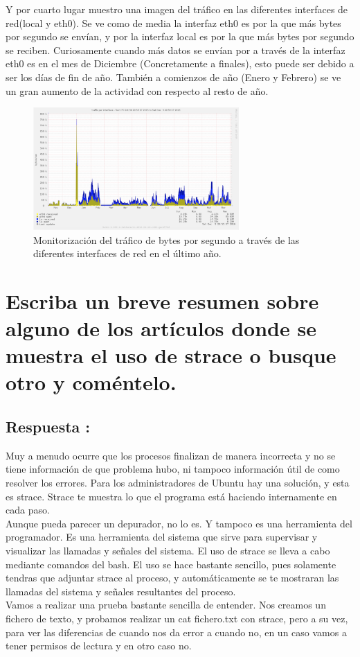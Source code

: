 Y por cuarto lugar muestro una imagen del tráfico en las diferentes interfaces de red(local y eth0). Se ve como de media la interfaz eth0 es por la que más bytes por segundo se envían, y por la interfaz local es por la que más bytes por segundo se reciben. Curiosamente cuando más datos se envían por a través de la interfaz eth0 es en el mes de Diciembre (Concretamente a finales), esto puede ser debido a ser los días de fin de año. También a comienzos de año (Enero y Febrero) se ve un gran aumento de la actividad con respecto al resto de año.
\begin{figure}[H]
	\begin{center}
		\includegraphics[width=0.7\textwidth]{Imagenes/Monitorizacion_interfaz_de_red}
		\caption{Monitorización del tráfico de bytes por segundo a través de las diferentes interfaces de red en el último año.} \label{fig:22}
	\end{center}
\end{figure}
\section{Escriba un breve resumen sobre alguno de los artículos donde se muestra el uso de strace o busque otro y coméntelo.}
\subsection{Respuesta : }
Muy a menudo ocurre que los procesos finalizan de manera incorrecta y no se tiene información de que problema hubo, ni tampoco información útil de como resolver los errores. Para los administradores de Ubuntu hay una solución, y esta es strace. Strace te muestra lo que el programa está haciendo internamente en cada paso.\\
\newline
Aunque pueda parecer un depurador, no lo es. Y tampoco es una herramienta del programador. Es una herramienta del sistema que sirve para supervisar y visualizar las llamadas y señales del sistema. El uso de strace se lleva a cabo mediante comandos del bash. El uso se hace bastante sencillo, pues solamente tendras que adjuntar strace al proceso, y automáticamente se te mostraran las llamadas del sistema y señales resultantes del proceso.\\
\newline
Vamos a realizar una prueba bastante sencilla de entender. Nos creamos un fichero de texto, y probamos realizar un cat fichero.txt con strace, pero a su vez, para ver las diferencias de cuando nos da error a cuando no, en un caso vamos a tener permisos de lectura y en otro caso no.

